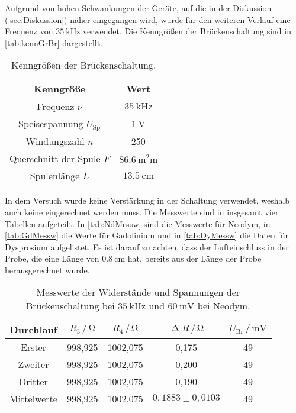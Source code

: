 \noindent
Aufgrund von hohen Schwankungen der Geräte, auf die in der Diskussion (\autoref{sec:Diskussion}) näher eingegangen wird, wurde für den weiteren Verlauf eine Frequenz von $\SI{35}{\kilo\hertz}$ verwendet.
Die Kenngrößen der Brückenschaltung sind in \autoref{tab:kennGrBr} dargestellt. 
\begin{table}[H]
  \centering
  \caption{Kenngrößen der Brückenschaltung.}
  \label{tab:kennGrBr}
  \begin{tabular}{c c}
    \toprule
    Kenngröße & Wert \\
    \midrule
    Frequenz $\nu$ & $\SI{35}{\kilo\hertz}$ \\
    Speisespannung $U_{\text{Sp}}$ & $\SI{1}{\volt}$ \\
    Windungszahl $n$ & 250 \\
    Querschnitt der Spule $F$ & $\SI{86,6}{\square\milli\meter}$ \\
    Spulenlänge $L$ & $\SI{13,5}{\centi\meter}$ \\
    \bottomrule
  \end{tabular}
\end{table}

\noindent
In dem Versuch wurde keine Verstärkung in der Schaltung verwendet, weshalb auch keine eingerechnet werden muss.
Die Messwerte sind in insgesamt vier Tabellen aufgeteilt. In \autoref{tab:NdMessw} sind die Messwerte für Neodym, in \autoref{tab:GdMessw} die Werte für Gadolinium und in \autoref{tab:DyMessw} die Daten für Dysprosium aufgelistet.
Es ist darauf zu achten, dass der Lufteinschluss in der Probe, die eine Länge von $\SI{0,8}{\centi\meter}$ hat, bereits aus der Länge der Probe herausgerechnet wurde.
\begin{table}[H]
  \centering
  \caption{Messwerte der Widerstände und Spannungen der Brückenschaltung bei $\SI{35}{\kilo\hertz}$ und $\SI{60}{\milli\volt}$ bei Neodym.}
  \label{tab:NdMessw}
  \begin{tabular}{c| c c c c}
    \toprule
    Durchlauf & $R_3 \,/\, \si{\ohm}$ & $R_4 \,/\, \si{\ohm}$ & $\upDelta R \,/\, \si{\ohm}$ & $U_{\text{Br}} \,/\, \si{\milli\volt}$ \\%
    \midrule
    Erster & 998,925 & 1002,075 & 0,175 & 49 \\
    Zweiter & 998,925 & 1002,075 & 0,200 & 49 \\
    Dritter & 998,925 & 1002,075 & 0,190 & 49 \\
    Mittelwerte & 998,925 & 1002,075 & $0,1883 \pm 0,0103$ & 49\\
    \bottomrule
  \end{tabular}
\end{table}

